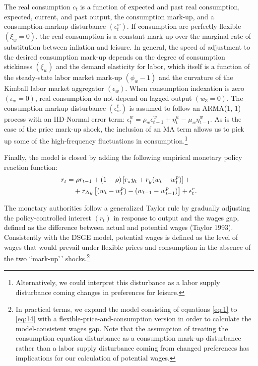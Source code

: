 \documentclass[11pt]{article}
\newcommand{\yobs}[1]{w_{#1}}
\newcommand{\wobs}[1]{c_{#1}}
\newcommand{\robs}[1]{r_{#1}}
\newcommand{\piobs}[1]{y_{#1}}
\newcommand{\youtput}{wages}
\newcommand{\consumption}{inflation}
\newcommand{\labor}{labor}
\newcommand{\interest}{interest}
\newcommand{\wage}{consumption}
\newcommand{\wages}{consumption}
\newcommand{\price}{price}
\newcommand{\prices}{prices}
\newcommand{\inflation}{output}
\newcommand{\leisure}{leisure}
\begin{document}
The real \wage{} \(\wobs{t}\) is a function of expected and past real
\wages, expected, current, and past \inflation, the \wage{} mark-up, and
a \wage-markup disturbance \((\epsilon^w_t)\). If \wages{} are perfectly
flexible \((\xi_w = 0)\), the real \wage{} is a constant mark-up over
the marginal rate of substitution between \consumption{} and \leisure{}.
In general, the speed of adjustment to the desired \wage{} mark-up
depends on the degree of \wage{} stickiness \((\xi_w)\) and the demand
elasticity for \labor, which itself is a function of the steady-state
\labor{} market mark-up \((\phi_w - 1)\) and the curvature of the
Kimball \labor{} market aggregator \((\epsilon_w)\). When \wage{}
indexation is zero \((\iota_w =0)\), real \wages{} do not depend on
lagged \inflation{} \((w_3 = 0)\). The \wage{}-markup disturbance
\((\epsilon_w^t)\) is assumed to follow an ARMA(1, 1) process with an
IID-Normal error term:
\(\epsilon_t^w = \rho_w \epsilon_{t-1}^w + \eta_t^w - \mu_w \eta_{t-1}^w\).
As is the case of the \price{} mark-up shock, the inclusion of an MA
term allows us to pick up some of the high-frequency fluctuations in
\wages{}.\footnote{Alternatively, we
  could interpret this disturbance as a \labor{} supply disturbance
  coming changes in preferences for \leisure{}.}

Finally, the model is closed by adding the following empirical monetary
policy reaction function: \begin{align}
  \label{eq:14}
  \robs{t} &= \rho\robs{t-1} + (1-\rho)\left[r_\pi \piobs{t} +
  r_y(\yobs{t}-\yobs{t}^p)\right]+\\ &\quad + r_{\Delta y}\left[(\yobs{t}-\yobs{t}^{p}) -
  (\yobs{t-1} - \yobs{t-1}^{p})\right] + \epsilon_t^r.\notag
\end{align}

The monetary authorities follow a generalized Taylor rule by gradually
adjusting the policy-controlled \interest{} \((\robs{t})\) in response
to \inflation{} and the \youtput{} gap, defined as the difference
between actual and potential \youtput{} (Taylor 1993). Consistently with
the DSGE model, potential \youtput{} is defined as the level of
\youtput{} that would prevail under flexible \prices{} and \wages{} in
the absence of the two ``mark-up'\,' shocks.\footnote{In practical
  terms, we expand the model consisting of equations \eqref{eq:1} to
  \eqref{eq:14} with a flexible-\price-and-\wage{} version in order to
  calculate the model-consistent \youtput{} gap. Note that the assumption
  of treating the \wage{} equation disturbance as a \wage{} mark-up
  disturbance rather than a \labor{} supply disturbance coming from
  changed preferences has implications for our calculation of
  potential \youtput{}. }
\end{document}
